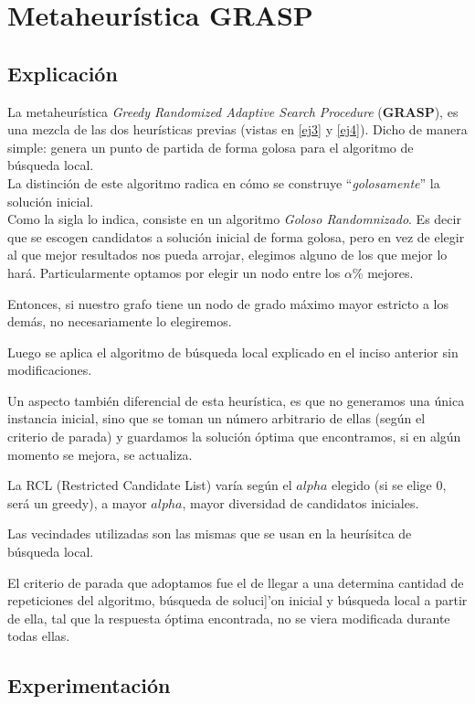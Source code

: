 \section{Metaheur\'istica GRASP}
\subsection{Explicaci\'on}
La metaheur\'istica \emph{Greedy Randomized Adaptive Search Procedure} (\textbf{GRASP}), es una mezcla de las dos heur\'isticas previas (vistas en \ref{ej3} y \ref{ej4}). Dicho de manera simple: genera un punto de partida de forma golosa para el algoritmo de b\'usqueda local.\\

La distinci\'on de este algoritmo radica en cómo se construye ``\textit{golosamente}'' la soluci\'on inicial.\\

Como la sigla lo indica, consiste en un algoritmo \textit{Goloso Randomnizado}. Es decir que se escogen candidatos a soluci\'on inicial de forma golosa, pero en vez de elegir al que mejor resultados nos pueda arrojar, elegimos alguno de los que mejor lo har\'a. Particularmente optamos por elegir un nodo entre los $\alpha$\% mejores.

Entonces, si nuestro grafo tiene un nodo de grado m\'aximo mayor estricto a los dem\'as, no necesariamente lo elegiremos.

Luego se aplica el algoritmo de b\'usqueda local explicado en el inciso anterior sin modificaciones.

Un aspecto tambi\'en diferencial de esta heur\'istica, es que no generamos una \'unica instancia inicial, sino que se toman un n\'umero arbitrario de ellas (seg\'un el criterio de parada) y guardamos la soluci\'on \'optima que encontramos, si en alg\'un momento se mejora, se actualiza.

La RCL (Restricted Candidate List) var\'ia seg\'un el $alpha$ elegido (si se elige 0, ser\'a un greedy), a mayor $alpha$, mayor diversidad de candidatos iniciales.

Las vecindades utilizadas son las mismas que se usan en la heur\'isitca de b\'usqueda local.

El criterio de parada que adoptamos fue el de llegar a una determina cantidad de repeticiones del algoritmo, b\'usqueda de soluci]'on inicial y b\'usqueda local a partir de ella, tal que la respuesta \'optima encontrada, no se viera modificada durante todas ellas.

\subsection{Experimentaci\'on}
